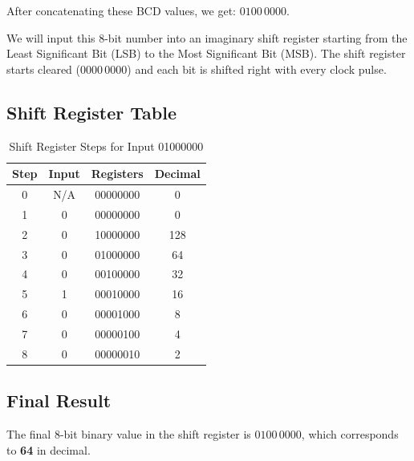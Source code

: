 \documentclass[12pt]{article}
\theoremstyle{definition}
\begin{document}
After concatenating these BCD values, we get: \( 0100 \, 0000 \).

We will input this 8-bit number into an imaginary shift register starting from the Least Significant Bit (LSB) to the Most Significant Bit (MSB). The shift register starts cleared (\( 0000 \, 0000 \)) and each bit is shifted right with every clock pulse.

\subsection*{Shift Register Table}

\begin{table}[H]
	\centering
	\renewcommand{\arraystretch}{1.5} %
	\begin{tabular}{|c|c|c|c|}
		\hline
		\rowcolor{gray!20}
		\textbf{Step} & \textbf{Input} & \textbf{Registers} & \textbf{Decimal} \\ \hline
		0 & N/A & 00000000 & 0   \\ \hline
		1 & 0   & 00000000 & 0   \\ \hline
		2 & 0   & 10000000 & 128 \\ \hline
		3 & 0   & 01000000 & 64  \\ \hline
		4 & 0   & 00100000 & 32  \\ \hline
		5 & 1   & 00010000 & 16  \\ \hline
		6 & 0   & 00001000 & 8   \\ \hline
		7 & 0   & 00000100 & 4   \\ \hline
		8 & 0   & 00000010 & 2   \\ \hline
	\end{tabular}
	\caption{Shift Register Steps for Input 01000000}
	\label{table:shift_register}
\end{table}

\subsection*{Final Result}
The final 8-bit binary value in the shift register is \( 0100 \, 0000 \), which corresponds to \textbf{64} in decimal.
\end{document}
